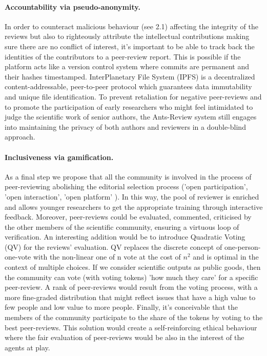 \documentclass[runningheads]{llncs}
\begin{document}
\paragraph{Accountability via pseudo-anonymity.} In order to counteract malicious behaviour (see 2.1) affecting the integrity of the reviews but also to righteously attribute the intellectual contributions making sure there are no conflict of interest, it's important to be able to track back the identities of the contributors to a peer-review report. This is possible if the platform acts like a version control system where commits are permanent and their hashes timestamped. InterPlanetary File System (IPFS) \cite{IPFS} is a decentralized content-addressable, peer-to-peer protocol which guarantees data immutability and unique file identification.
\newline To prevent retaliation for negative peer-reviews and to promote the participation of early researchers who might feel intimidated to judge the scientific work of senior authors, the Ants-Review system still engages into maintaining the privacy of both authors and reviewers in a double-blind approach.

\paragraph{Inclusiveness via gamification.} As a final step we propose that all the community is involved in the process of peer-reviewing abolishing the editorial selection process ('open participation', 'open interaction', 'open platform' \cite{OPR-Ross-Hellauer}). In this way, the pool of reviewer is enriched and allows younger researchers to get the appropriate training through interactive feedback. Moreover, peer-reviews could be evaluated, commented, criticised by the other members of the scientific community, ensuring a virtuous loop of verification. \newline An interesting addition would be to introduce Quadratic Voting (QV) \cite{QVWeyl} for the reviews' evaluation. QV replaces the discrete concept of one-person-one-vote with the non-linear one of n vote at the cost of $n^2$ and is optimal in the context of multiple choices. If we consider scientific outputs as public goods, then the community can vote (with voting tokens) 'how much they care' for a specific peer-review. A rank of peer-reviews would result from the voting process, with a more fine-graded distribution that might reflect issues that have a high value to few people and low value to more people. \newline Finally, it's conceivable that the members of the community participate to the share of the tokens by voting to the best peer-reviews. This solution would create a self-reinforcing ethical behaviour where the fair evaluation of peer-reviews would be also in the interest of the agents at play.
\end{document}
